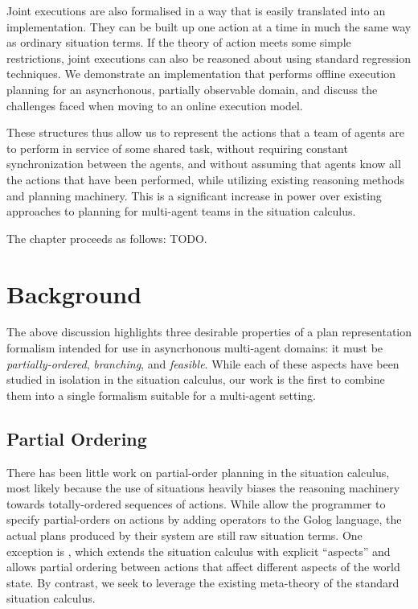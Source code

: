 Joint executions are also formalised in a way that is easily translated
into an implementation. They can be built up one action at a time
in much the same way as ordinary situation terms. If the theory of
action meets some simple restrictions, joint executions can also be
reasoned about using standard regression techniques. We demonstrate
an implementation that performs offline execution planning for an
asyncrhonous, partially observable domain, and discuss the challenges
faced when moving to an online execution model.

These structures thus allow us to represent the actions that a team
of agents are to perform in service of some shared task, without requiring
constant synchronization between the agents, and without assuming
that agents know all the actions that have been performed, while utilizing
existing reasoning methods and planning machinery. This is a significant
increase in power over existing approaches to planning for multi-agent
teams in the situation calculus.

The chapter proceeds as follows: TODO.


\section{Background\label{sec:JointExec:Background}}

The above discussion highlights three desirable properties of a plan
representation formalism intended for use in asyncrhonous multi-agent
domains: it must be \emph{partially-ordered}, \emph{branching}, and
\emph{feasible}. While each of these aspects have been studied in
isolation in the situation calculus, our work is the first to combine
them into a single formalism suitable for a multi-agent setting.


\subsection{Partial Ordering}

There has been little work on partial-order planning in the situation
calculus, most likely because the use of situations heavily biases
the reasoning machinery towards totally-ordered sequences of actions.
While \citet{son00htn_golog} allow the programmer to specify partial-orders
on actions by adding operators to the Golog language, the actual plans
produced by their system are still raw situation terms. One exception
is \citep{plaisted97sc_aspect}, which extends the situation calculus
with explicit {}``aspects'' and allows partial ordering between
actions that affect different aspects of the world state. By contrast,
we seek to leverage the existing meta-theory of the standard situation
calculus.

